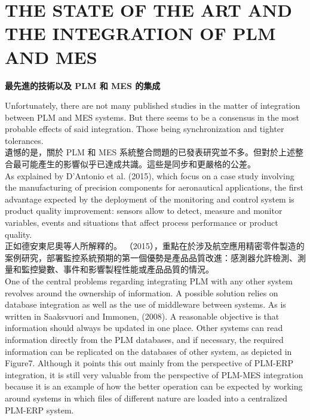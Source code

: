 \chapter{THE STATE OF THE ART AND THE INTEGRATION OF PLM AND MES} 
\setcounter{page}{17}  %
\begin{center}
\fontsize{18}{16}\selectfont \textbf{最先進的技術以及 PLM 和 MES 的集成}\\
\end{center}
\vspace{2em}

\fontsize{14pt}{2.5pt}\sectionef 
{Unfortunately, there are not many published studies in the matter of integration between PLM and MES systems. But there seems to be a consensus in the most probable effects of said integration. Those being synchronization and tighter tolerances.}\\[10pt]

\fontsize{14pt}{5pt}\sectionef
 {遺憾的是，關於 PLM 和 MES 系統整合問題的已發表研究並不多。但對於上述整合最可能產生的影響似乎已達成共識。這些是同步和更嚴格的公差。}\\[15pt]

\fontsize{14pt}{2.5pt}\sectionef 
{As explained by D’Antonio et al. (2015), which focus on a case study involving the manufacturing of precision components for aeronautical applications, the first advantage expected by the deployment of the monitoring and control system is product quality improvement: sensors allow to detect, measure and monitor variables, events and situations that affect process performance or product quality.}\\[10pt]

\fontsize{14pt}{5pt}\sectionef
 {正如德安東尼奧等人所解釋的。 （2015），重點在於涉及航空應用精密零件製造的案例研究，部署監控系統預期的第一個優勢是產品品質改進：感測器允許檢測、測量和監控變數、事件和影響製程性能或產品品質的情況。
}\\[15pt]

\fontsize{14pt}{2.5pt}\sectionef 
{One of the central problems regarding integrating PLM with any other system revolves around the ownership of information. A possible solution relies on database integration as well as the use of middleware between systems. As is written in Saaksvuori and Immonen, (2008). A reasonable objective is that information should always be updated in one place. Other systems can read information directly from the PLM databases, and if necessary, the required information can be replicated on the databases of other system, as depicted in Figure7. Although it points this out mainly from the perspective of PLM-ERP integration, it is still very valuable from the perspective of PLM-MES integration because it is an example of how the better operation can be expected by working around systems in which files of different nature are loaded into a centralized PLM-ERP system.}\\[10pt]


